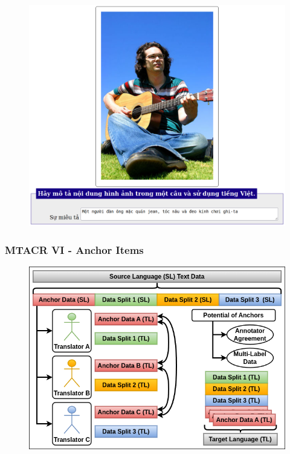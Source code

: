 \documentclass[aspectratio=169]{beamer}
\begin{document}
\begin{frame}[fragile]
\begin{minipage}{.45\textwidth}
\begin{figure}
        \end{figure}
    \end{minipage}\hfill%
    \begin{minipage}{.35\textwidth}
        \centering
        \begin{figure}
            \includegraphics[width=1.0\textwidth]{images/mtacr-potato-flickr30k-vie.png} 
        \end{figure}
    \end{minipage}
\end{frame}

\begin{frame}[fragile]
	\frametitle{MTACR VI - Anchor Items}
    \begin{figure}
	    \centering
	    \includegraphics[width=.70\textwidth]{images/CRAMT-Tool-AnnotationQuality.png}
	\end{figure}
\end{frame}
\end{document}
